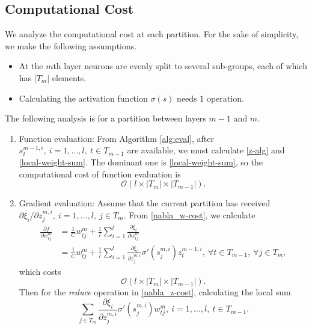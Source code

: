 \documentclass[12pt]{article}
\begin{document}
\subsection{Computational Cost}
\label{subsec:Computation-cost}
We analyze the computational cost at each partition.
For the sake of simplicity, we make the following assumptions.
\begin{itemize}
\item At the $m$th layer neurons are evenly split to several sub-groups, each of which has $|T_m|$ elements.
\item Calculating the activation function $\sigma(s)$ needs $1$ operation.
\end{itemize}
The following analysis is for a partition between layers $m-1$ and $m$.
\begin{enumerate}[1.]
\item Function evaluation: From Algorithm \ref{alg:eval}, after $s^{m-1,i}_t,\ i=1,\ldots,l,\ t \in T_{m-1}$ are available, we must calculate \eqref{z-alg} and \eqref{local-weight-sum}. 
The dominant one is \eqref{local-weight-sum}, so the computational cost of function evaluation is
\begin{equation}
\label{f-compu-cost}
\mathcal {O} (l \times |T_m| \times |T_{m-1}|). 
\end{equation}
\item Gradient evaluation: 
Assume that the current partition has received $\partial \xi_i/\partial z^{m,i}_j,\ i=1,\ldots,l,\ j \in T_m$.
From \eqref{nabla_w-cost}, we calculate
\begin{align*}
\frac{\partial f}{\partial w^m_{tj}} 
&= \frac{1}{C}w^m_{tj} + \frac{1}{l} \sum_{i=1}^l \frac{\partial \xi_i}{\partial w^m_{tj}} \\
&= \frac{1}{C}w^m_{tj} + \frac{1}{l} \sum_{i=1}^l \frac{\partial \xi_i}{\partial z^{m,i}_j} \sigma'(s^{m,i}_j) z^{m-1,i}_t,\ \forall t \in T_{m-1},\ \forall j \in T_{m}, 
\end{align*}
which costs
\begin{equation*}
\mathcal {O} ( l \times |T_m| \times |T_{m-1}|). 
\end{equation*}
Then for the {\it reduce} operation in \eqref{nabla_z-cost}, calculating the local sum
\begin{equation*}
\sum_{j \in T_m} \frac{\partial \xi_i}{\partial z^{m,i}_j} \sigma'(s^{m,i}_j) w^m_{tj} ,\ i=1,\ldots,l,\ t \in T_{m-1}.
\end{equation*}

\end{enumerate}
\end{document}
